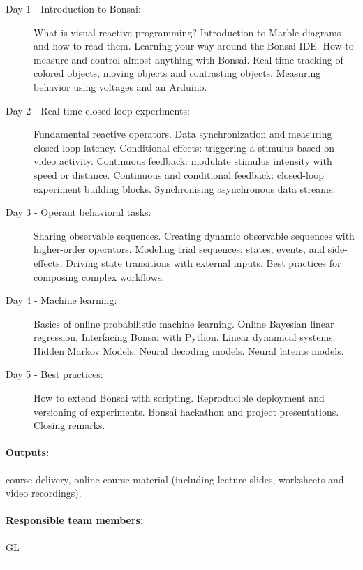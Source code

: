 \begin{description}
    \item[Day 1 - Introduction to Bonsai:] What is visual reactive programming? Introduction to Marble diagrams and how to read them. Learning your way around the Bonsai IDE. How to measure and control almost anything with Bonsai. Real-time tracking of colored objects, moving objects and contrasting objects. Measuring behavior using voltages and an Arduino.

    \item[Day 2 - Real-time closed-loop experiments:] Fundamental reactive operators. Data synchronization and measuring closed-loop latency. Conditional effects: triggering a stimulus based on video activity. Continuous feedback: modulate stimulus intensity with speed or distance. Continuous and conditional feedback: closed-loop experiment building blocks. Synchronising asynchronous data streams.

    \item[Day 3 - Operant behavioral tasks:] Sharing observable sequences. Creating dynamic observable sequences with higher-order operators. Modeling trial sequences: states, events, and side-effects. Driving state transitions with external inputs. Best practices for composing complex workflows.

    \item[Day 4 - Machine learning:] Basics of online probabilistic machine learning. Online Bayesian linear regression. Interfacing Bonsai with Python. Linear dynamical systems. Hidden Markov Models. Neural decoding models. Neural latents models.

    \item[Day 5 - Best practices:] How to extend Bonsai with scripting. Reproducible deployment and versioning of experiments. Bonsai hackathon and project presentations. Closing remarks.
\end{description}

\paragraph{Outputs:} course delivery, online course material (including lecture
slides, worksheets and video recordings).

\paragraph{Responsible team members:} GL

\noindent\rule{\textwidth}{1pt}
